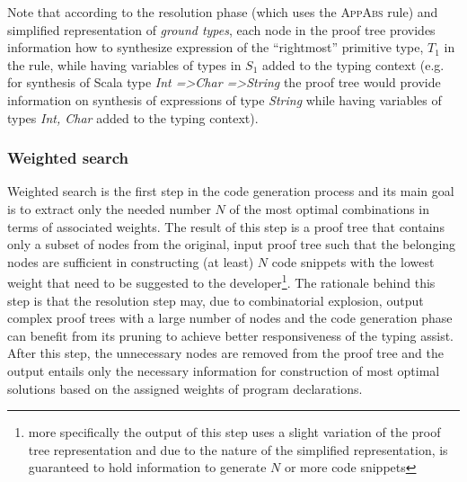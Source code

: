 Note that according to the resolution phase (which uses the \textsc{AppAbs} rule) and simplified representation of \textit{ground types}, each node in the proof tree provides information how to synthesize expression of the ``rightmost'' primitive type, $T_1$ in the rule, while having variables of types in $S_1$ added to the typing context (e.g. for synthesis of Scala type \textit{Int =\textgreater Char =\textgreater String} the proof tree would provide information on synthesis of expressions of type \textit{String} while having variables of types \textit{Int, Char} added to the typing context).


\subsubsection{Weighted search}

Weighted search is the first step in the code generation process and its main goal is to extract only the needed number $N$ of the most optimal combinations in terms of associated weights.
The result of this step is a proof tree that contains only a subset of nodes from the original, input proof tree such that the belonging nodes are sufficient in constructing (at least) $N$ code snippets with the lowest weight that need to be suggested to the developer\footnote{more specifically the output of this step uses a slight variation of the proof tree representation and due to the nature of the simplified representation, is guaranteed to hold information to generate $N$ or more code snippets}.  
The rationale behind this step is that the resolution step may, due to combinatorial explosion, output complex proof trees with a large number of nodes and the code generation phase can benefit from its pruning to achieve better responsiveness of the typing assist.
After this step, the unnecessary nodes are removed from the proof tree and the output entails only the necessary information for construction of most optimal solutions based on the assigned weights of program declarations.

